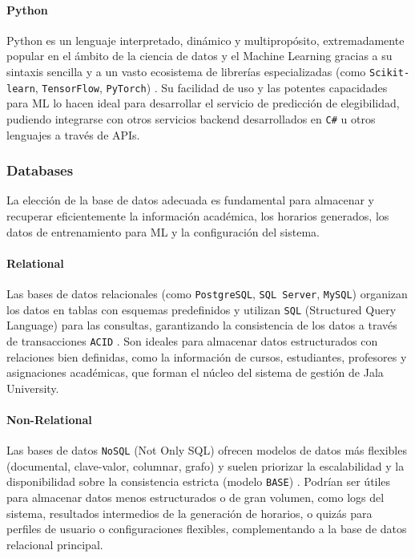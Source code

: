 \paragraph{Python}
Python es un lenguaje interpretado, dinámico y multipropósito, extremadamente popular en el ámbito de la ciencia de datos y el Machine Learning gracias a su sintaxis sencilla y a un vasto ecosistema de librerías especializadas (como \texttt{Scikit-learn}, \texttt{TensorFlow}, \texttt{PyTorch}) \parencite{PythonSoftwareFoundation}. Su facilidad de uso y las potentes capacidades para ML lo hacen ideal para desarrollar el servicio de predicción de elegibilidad, pudiendo integrarse con otros servicios backend desarrollados en \texttt{C\#} u otros lenguajes a través de APIs.

\subsubsection{Databases}
La elección de la base de datos adecuada es fundamental para almacenar y recuperar eficientemente la información académica, los horarios generados, los datos de entrenamiento para ML y la configuración del sistema.

\paragraph{Relational}
Las bases de datos relacionales (como \texttt{PostgreSQL}, \texttt{SQL Server}, \texttt{MySQL}) organizan los datos en tablas con esquemas predefinidos y utilizan \texttt{SQL} (Structured Query Language) para las consultas, garantizando la consistencia de los datos a través de transacciones \texttt{ACID} \parencite{Date2003}. Son ideales para almacenar datos estructurados con relaciones bien definidas, como la información de cursos, estudiantes, profesores y asignaciones académicas, que forman el núcleo del sistema de gestión de Jala University.

\paragraph{Non-Relational}
Las bases de datos \texttt{NoSQL} (Not Only SQL) ofrecen modelos de datos más flexibles (documental, clave-valor, columnar, grafo) y suelen priorizar la escalabilidad y la disponibilidad sobre la consistencia estricta (modelo \texttt{BASE}) \parencite{SadalegeFowler2012}. Podrían ser útiles para almacenar datos menos estructurados o de gran volumen, como logs del sistema, resultados intermedios de la generación de horarios, o quizás para perfiles de usuario o configuraciones flexibles, complementando a la base de datos relacional principal.


